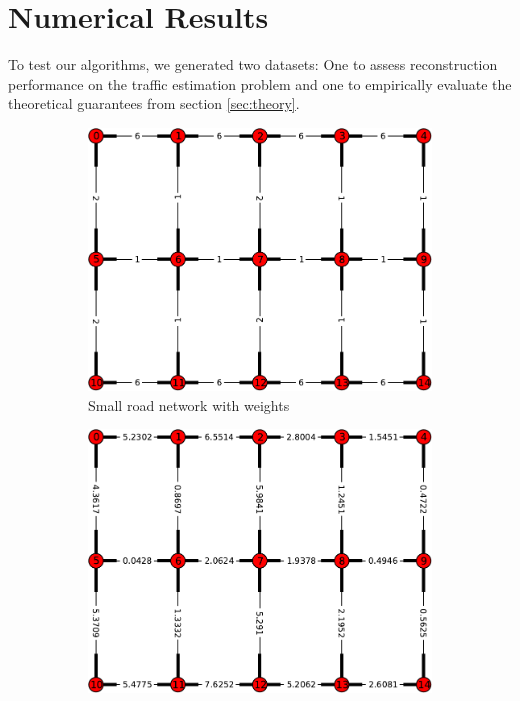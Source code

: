 \documentclass{article} %
\begin{document}
\section{Numerical Results}

To test our algorithms, we generated two datasets: One to assess reconstruction performance on the traffic estimation problem and one to empirically evaluate the theoretical guarantees from section \ref{sec:theory}.
\begin{figure}
  \centering
  \begin{subfigure}[h]{0.4\textwidth}
    \includegraphics[width=\textwidth]{figures/small-graph.pdf}
    \caption{Small road network with weights}
  \end{subfigure}
  \qquad
  \begin{subfigure}[h]{0.4\textwidth}
    \includegraphics[width=\textwidth]{figures/small-flow.pdf}

\end{subfigure}
\end{figure}
\end{document}
